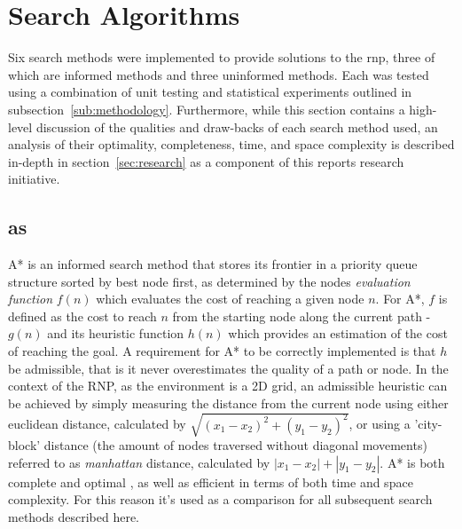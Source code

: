 \section{Search Algorithms} %
\label{sec:search_algorithms}
Six search methods were implemented to provide solutions to the \gls{rnp}, three of which are \gls{informed} methods and three \gls{uninformed} methods. Each was tested using a combination of unit testing and statistical experiments outlined in subsection~\ref{sub:methodology}. Furthermore, while this section contains a high-level discussion of the qualities and draw-backs of each search method used, an analysis of their optimality, completeness, time, and space complexity is described in-depth in section~\ref{sec:research} as a component of this reports research initiative.

\subsection{\texorpdfstring{\acrfull{as}}{A*}} %
\label{sub:as}
A* is an \gls{informed} search method that stores its frontier in a priority queue structure sorted by best node first, as determined by the nodes \textit{evaluation function} $f(n)$ which evaluates the cost of reaching a given node $n$. For A*, $f$ is defined as the cost to reach $n$ from the starting node along the current path - $g(n)$ and its heuristic function $h(n)$ which provides an estimation of the cost of reaching the goal. A requirement for A* to be correctly implemented is that $h$ be \gls{admissible}, that is it never overestimates the quality of a path or node. In the context of the RNP, as the environment is a 2D grid, an admissible heuristic can be achieved by simply measuring the distance from the current node using either euclidean distance, calculated by $\sqrt{(x_1 - x_2)^2 + (y_1 - y_2)^2}$, or using a 'city-block' distance (the amount of nodes traversed without diagonal movements) referred to as \textit{manhattan} distance, calculated by $\left|x_1 - x_2\right| + \left|y_1 - y_2\right|$. A* is both complete and optimal \parencite[104]{astar}, as well as efficient in terms of both time and space complexity. For this reason it's used as a comparison for all subsequent search methods described here.

